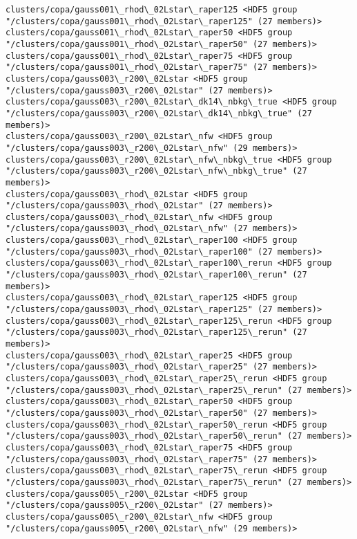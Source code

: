 \documentclass[11pt]{article}
\begin{document}
\begin{Verbatim}[commandchars=\\\{\}]
clusters/copa/gauss001\_rhod\_02Lstar\_raper125 <HDF5 group "/clusters/copa/gauss001\_rhod\_02Lstar\_raper125" (27 members)>
clusters/copa/gauss001\_rhod\_02Lstar\_raper50 <HDF5 group "/clusters/copa/gauss001\_rhod\_02Lstar\_raper50" (27 members)>
clusters/copa/gauss001\_rhod\_02Lstar\_raper75 <HDF5 group "/clusters/copa/gauss001\_rhod\_02Lstar\_raper75" (27 members)>
clusters/copa/gauss003\_r200\_02Lstar <HDF5 group "/clusters/copa/gauss003\_r200\_02Lstar" (27 members)>
clusters/copa/gauss003\_r200\_02Lstar\_dk14\_nbkg\_true <HDF5 group "/clusters/copa/gauss003\_r200\_02Lstar\_dk14\_nbkg\_true" (27 members)>
clusters/copa/gauss003\_r200\_02Lstar\_nfw <HDF5 group "/clusters/copa/gauss003\_r200\_02Lstar\_nfw" (29 members)>
clusters/copa/gauss003\_r200\_02Lstar\_nfw\_nbkg\_true <HDF5 group "/clusters/copa/gauss003\_r200\_02Lstar\_nfw\_nbkg\_true" (27 members)>
clusters/copa/gauss003\_rhod\_02Lstar <HDF5 group "/clusters/copa/gauss003\_rhod\_02Lstar" (27 members)>
clusters/copa/gauss003\_rhod\_02Lstar\_nfw <HDF5 group "/clusters/copa/gauss003\_rhod\_02Lstar\_nfw" (27 members)>
clusters/copa/gauss003\_rhod\_02Lstar\_raper100 <HDF5 group "/clusters/copa/gauss003\_rhod\_02Lstar\_raper100" (27 members)>
clusters/copa/gauss003\_rhod\_02Lstar\_raper100\_rerun <HDF5 group "/clusters/copa/gauss003\_rhod\_02Lstar\_raper100\_rerun" (27 members)>
clusters/copa/gauss003\_rhod\_02Lstar\_raper125 <HDF5 group "/clusters/copa/gauss003\_rhod\_02Lstar\_raper125" (27 members)>
clusters/copa/gauss003\_rhod\_02Lstar\_raper125\_rerun <HDF5 group "/clusters/copa/gauss003\_rhod\_02Lstar\_raper125\_rerun" (27 members)>
clusters/copa/gauss003\_rhod\_02Lstar\_raper25 <HDF5 group "/clusters/copa/gauss003\_rhod\_02Lstar\_raper25" (27 members)>
clusters/copa/gauss003\_rhod\_02Lstar\_raper25\_rerun <HDF5 group "/clusters/copa/gauss003\_rhod\_02Lstar\_raper25\_rerun" (27 members)>
clusters/copa/gauss003\_rhod\_02Lstar\_raper50 <HDF5 group "/clusters/copa/gauss003\_rhod\_02Lstar\_raper50" (27 members)>
clusters/copa/gauss003\_rhod\_02Lstar\_raper50\_rerun <HDF5 group "/clusters/copa/gauss003\_rhod\_02Lstar\_raper50\_rerun" (27 members)>
clusters/copa/gauss003\_rhod\_02Lstar\_raper75 <HDF5 group "/clusters/copa/gauss003\_rhod\_02Lstar\_raper75" (27 members)>
clusters/copa/gauss003\_rhod\_02Lstar\_raper75\_rerun <HDF5 group "/clusters/copa/gauss003\_rhod\_02Lstar\_raper75\_rerun" (27 members)>
clusters/copa/gauss005\_r200\_02Lstar <HDF5 group "/clusters/copa/gauss005\_r200\_02Lstar" (27 members)>
clusters/copa/gauss005\_r200\_02Lstar\_nfw <HDF5 group "/clusters/copa/gauss005\_r200\_02Lstar\_nfw" (29 members)>

\end{Verbatim}
\end{document}
